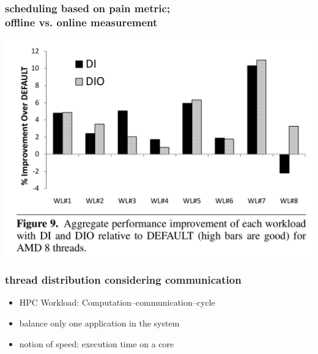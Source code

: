 \documentclass[utf8,10pt]{beamer}
\begin{document}
\begin{frame}
  \frametitle{scheduling based on pain metric;\\ offline vs. online measurement
    }
  \centering
  \includegraphics[height=0.7\textheight, keepaspectratio]{./opteron_di_dio}
\end{frame}


\begin{frame}
  \frametitle{thread distribution considering
    communication}
    \begin{itemize}
      \item  HPC Workload: Computation--communication--cycle
      \item  balance only one application in the system
      \item  notion of speed: execution time on a core
    \end{itemize}
\end{frame}
\end{document}
